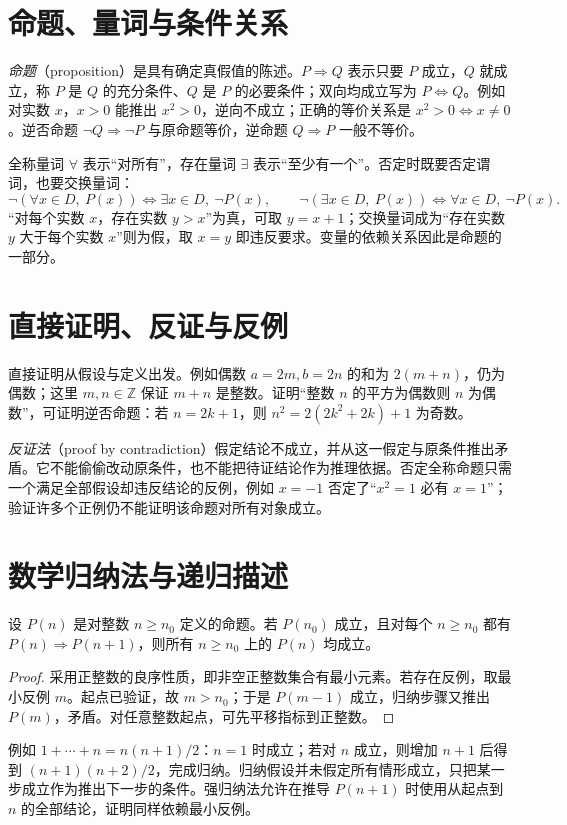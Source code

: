 \section{命题、量词与条件关系}
\emph{命题}（proposition）是具有确定真假值的陈述。$P\Rightarrow Q$ 表示只要 $P$ 成立，$Q$ 就成立，称 $P$ 是 $Q$ 的充分条件、$Q$ 是 $P$ 的必要条件；双向均成立写为 $P\Leftrightarrow Q$。例如对实数 $x$，$x>0$ 能推出 $x^2>0$，逆向不成立；正确的等价关系是 $x^2>0\Leftrightarrow x\ne0$。逆否命题 $\neg Q\Rightarrow\neg P$ 与原命题等价，逆命题 $Q\Rightarrow P$ 一般不等价。

全称量词 $\forall$ 表示“对所有”，存在量词 $\exists$ 表示“至少有一个”。否定时既要否定谓词，也要交换量词：
\[
 \neg(\forall x\in D,\ P(x))\Longleftrightarrow
 \exists x\in D,\ \neg P(x),\qquad
 \neg(\exists x\in D,\ P(x))\Longleftrightarrow
 \forall x\in D,\ \neg P(x).
\]
“对每个实数 $x$，存在实数 $y>x$”为真，可取 $y=x+1$；交换量词成为“存在实数 $y$ 大于每个实数 $x$”则为假，取 $x=y$ 即违反要求。变量的依赖关系因此是命题的一部分。

\section{直接证明、反证与反例}
直接证明从假设与定义出发。例如偶数 $a=2m,b=2n$ 的和为 $2(m+n)$，仍为偶数；这里 $m,n\in\mathbb Z$ 保证 $m+n$ 是整数。证明“整数 $n$ 的平方为偶数则 $n$ 为偶数”，可证明逆否命题：若 $n=2k+1$，则 $n^2=2(2k^2+2k)+1$ 为奇数。

\emph{反证法}（proof by contradiction）假定结论不成立，并从这一假定与原条件推出矛盾。它不能偷偷改动原条件，也不能把待证结论作为推理依据。否定全称命题只需一个满足全部假设却违反结论的反例，例如 $x=-1$ 否定了“$x^2=1$ 必有 $x=1$”；验证许多个正例仍不能证明该命题对所有对象成立。

\section{数学归纳法与递归描述}
\begin{theorem}[数学归纳法]
设 $P(n)$ 是对整数 $n\ge n_0$ 定义的命题。若 $P(n_0)$ 成立，且对每个 $n\ge n_0$ 都有 $P(n)\Rightarrow P(n+1)$，则所有 $n\ge n_0$ 上的 $P(n)$ 均成立。
\end{theorem}
\begin{proof}
采用正整数的良序性质，即非空正整数集合有最小元素。若存在反例，取最小反例 $m$。起点已验证，故 $m>n_0$；于是 $P(m-1)$ 成立，归纳步骤又推出 $P(m)$，矛盾。对任意整数起点，可先平移指标到正整数。
\end{proof}
例如 $1+\cdots+n=n(n+1)/2$：$n=1$ 时成立；若对 $n$ 成立，则增加 $n+1$ 后得到 $(n+1)(n+2)/2$，完成归纳。归纳假设并未假定所有情形成立，只把某一步成立作为推出下一步的条件。强归纳法允许在推导 $P(n+1)$ 时使用从起点到 $n$ 的全部结论，证明同样依赖最小反例。

